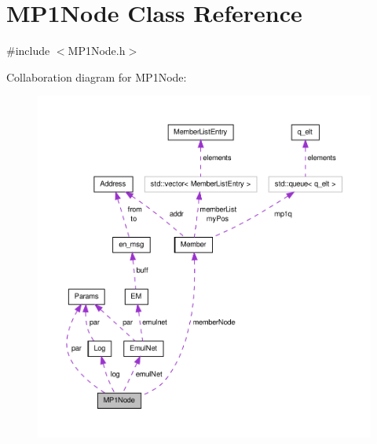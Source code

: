 \hypertarget{class_m_p1_node}{\section{\-M\-P1\-Node \-Class \-Reference}
\label{db/d4b/class_m_p1_node}
}


{\ttfamily \#include $<$\-M\-P1\-Node.\-h$>$}



\-Collaboration diagram for \-M\-P1\-Node\-:
\nopagebreak
\begin{figure}[H]
\begin{center}
\leavevmode
\includegraphics[width=350pt]{d1/de2/class_m_p1_node__coll__graph}
\end{center}
\end{figure}
